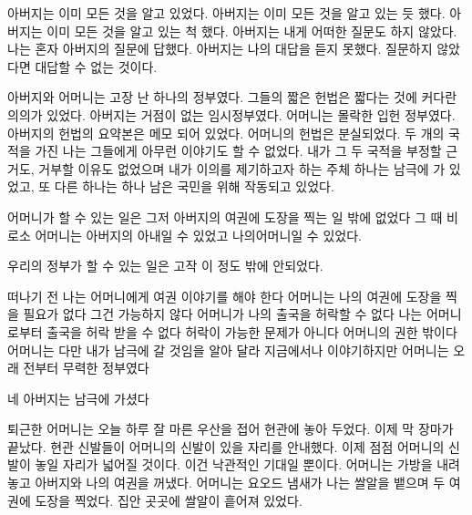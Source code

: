 아버지는 이미 모든 것을 알고 있었다. 아버지는 이미 모든 것을 알고 있는 듯 했다. 아버지는 이미 모든 것을 알고 있는 척 했다. 아버지는 내게 어떠한 질문도 하지 않았다. 나는 혼자 아버지의 질문에 답했다. 아버지는 나의 대답을 듣지 못했다. 질문하지 않았다면 대답할 수 없는 것이다.



아버지와 어머니는 고장 난 하나의 정부였다. 그들의 짧은 헌법은 짧다는 것에 커다란 의의가 있었다. 아버지는 거점이 없는 임시정부였다. 어머니는 몰락한 입헌 정부였다. 아버지의 헌법의 요약본은 메모 되어 있었다. 어머니의 헌법은 분실되었다. 두 개의 국적을 가진 나는 그들에게 아무런 이야기도 할 수 없었다. 내가 그 두 국적을 부정할 근거도, 거부할 이유도 없었으며 내가 이의를 제기하고자 하는 주체 하나는 남극에 가 있었고, 또 다른 하나는 하나 남은 국민을 위해 작동되고 있었다.



어머니가 할 수 있는 일은 그저 아버지의 여권에 도장을 찍는 일 밖에 없었다 그 때 비로소 어머니는 아버지의 아내일 수 있었고 나의어머니일 수 있었다.



우리의 정부가 할 수 있는 일은 고작 이 정도 밖에 안되었다.



떠나기 전 나는 어머니에게 여권 이야기를 해야 한다 어머니는 나의 여권에 도장을 찍을 필요가 없다 그건 가능하지 않다 어머니가 나의 출국을 허락할 수 없다 나는 어머니로부터 출국을 허락 받을 수 없다 허락이 가능한 문제가 아니다 어머니의 권한 밖이다 어머니는 다만 내가 남극에 갈 것임을 알아 달라 지금에서나 이야기하지만 어머니는 오래 전부터 무력한 정부였다



네 아버지는 남극에 가셨다



퇴근한 어머니는 오늘 하루 잘 마른 우산을 접어 현관에 놓아 두었다. 이제 막 장마가 끝났다. 현관 신발들이 어머니의 신발이 있을 자리를 안내했다. 이제 점점 어머니의 신발이 놓일 자리가 넓어질 것이다. 이건 낙관적인 기대일 뿐이다. 어머니는 가방을 내려놓고 아버지와 나의 여권을 꺼냈다. 어머니는 요오드 냄새가 나는 쌀알을 뱉으며 두 여권에 도장을 찍었다. 집안 곳곳에 쌀알이 흩어져 있었다.

